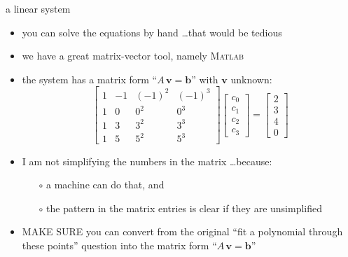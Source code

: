 \documentclass[10pt,hyperref]{beamer}
\newcommand{\bb}{\mathbf{b}}
\newcommand{\bv}{\mathbf{v}}
\newcommand{\Matlab}{\textsc{Matlab}\xspace}
\newcommand{\MO}{\Matlab}
\newcommand{\MS}{\alert{MAKE SURE}\xspace}
\begin{document}
\begin{frame}{a linear system}
\begin{itemize}
\item you can solve the equations by hand \dots that would be tedious
\item we have a great matrix-vector tool, namely \MO
\item the system has a matrix form ``$A\, \bv = \bb$'' with $\bv$ unknown:
$$\begin{bmatrix}
1 & -1 & (-1)^2 & (-1)^3 \\
1 & 0 & 0^2 & 0^3 \\
1 & 3 & 3^2 & 3^3 \\
1 & 5 & 5^2 & 5^3
\end{bmatrix}\begin{bmatrix}
c_0 \\ c_1 \\ c_2 \\ c_3
\end{bmatrix}
=
\begin{bmatrix}
2 \\ 3 \\ 4 \\ 0
\end{bmatrix}$$
\item I am not simplifying the numbers in the matrix \dots because:
  \begin{itemize}
  \item[$\circ$] a machine can do that, and 
  \item[$\circ$] the pattern in the matrix entries is clear if they are unsimplified
  \end{itemize}
\item \MS you can convert from the original ``fit a polynomial through these points'' question into the matrix form ``$A\, \bv = \bb$''
\end{itemize}
\end{frame}
\end{document}

